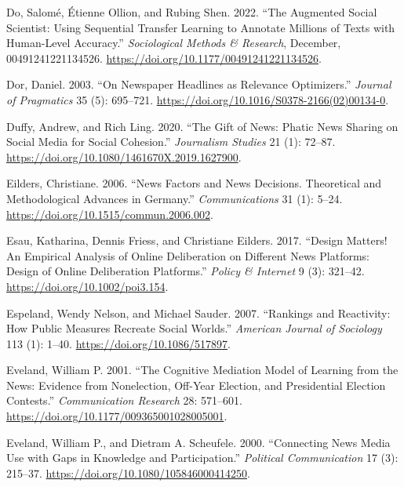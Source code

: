 \documentclass[
]{article}
\newlength{\cslhangindent}
\newlength{\cslentryspacingunit} %
\newenvironment{CSLReferences}[2] %
 {%
  \setlength{\parindent}{0pt}
  \ifodd #1
  \let\oldpar\par
  \def\par{\hangindent=\cslhangindent\oldpar}
  \fi
  \setlength{\parskip}{#2\cslentryspacingunit}
 }%
 {}
\begin{document}
\begin{CSLReferences}{1}{0}
\leavevmode{}%
Do, Salomé, Étienne Ollion, and Rubing Shen. 2022. {``The {Augmented}
{Social} {Scientist}: {Using} {Sequential} {Transfer} {Learning} to
{Annotate} {Millions} of {Texts} with {Human}-{Level} {Accuracy}.''}
\emph{Sociological Methods \& Research}, December, 00491241221134526.
\url{https://doi.org/10.1177/00491241221134526}.

\leavevmode{}%
Dor, Daniel. 2003. {``On Newspaper Headlines as Relevance Optimizers.''}
\emph{Journal of Pragmatics} 35 (5): 695--721.
\url{https://doi.org/10.1016/S0378-2166(02)00134-0}.

\leavevmode{}%
Duffy, Andrew, and Rich Ling. 2020. {``The {Gift} of {News}: {Phatic}
{News} {Sharing} on {Social} {Media} for {Social} {Cohesion}.''}
\emph{Journalism Studies} 21 (1): 72--87.
\url{https://doi.org/10.1080/1461670X.2019.1627900}.

\leavevmode{}%
Eilders, Christiane. 2006. {``News {Factors} and {News} {Decisions}.
{Theoretical} and {Methodological} {Advances} in {Germany}.''}
\emph{Communications} 31 (1): 5--24.
\url{https://doi.org/10.1515/commun.2006.002}.

\leavevmode{}%
Esau, Katharina, Dennis Friess, and Christiane Eilders. 2017. {``Design
{Matters}! {An} {Empirical} {Analysis} of {Online} {Deliberation} on
{Different} {News} {Platforms}: {Design} of {Online} {Deliberation}
{Platforms}.''} \emph{Policy \& Internet} 9 (3): 321--42.
\url{https://doi.org/10.1002/poi3.154}.

\leavevmode{}%
Espeland, Wendy Nelson, and Michael Sauder. 2007. {``Rankings and
{Reactivity}: {How} {Public} {Measures} {Recreate} {Social} {Worlds}.''}
\emph{American Journal of Sociology} 113 (1): 1--40.
\url{https://doi.org/10.1086/517897}.

\leavevmode{}%
Eveland, William P. 2001. {``The Cognitive Mediation Model of Learning
from the News: {Evidence} from Nonelection, Off-Year Election, and
Presidential Election Contests.''} \emph{Communication Research} 28:
571--601. \url{https://doi.org/10.1177/009365001028005001}.

\leavevmode{}%
Eveland, William P., and Dietram A. Scheufele. 2000. {``Connecting
{News} {Media} {Use} with {Gaps} in {Knowledge} and {Participation}.''}
\emph{Political Communication} 17 (3): 215--37.
\url{https://doi.org/10.1080/105846000414250}.


\end{CSLReferences}
\end{document}
